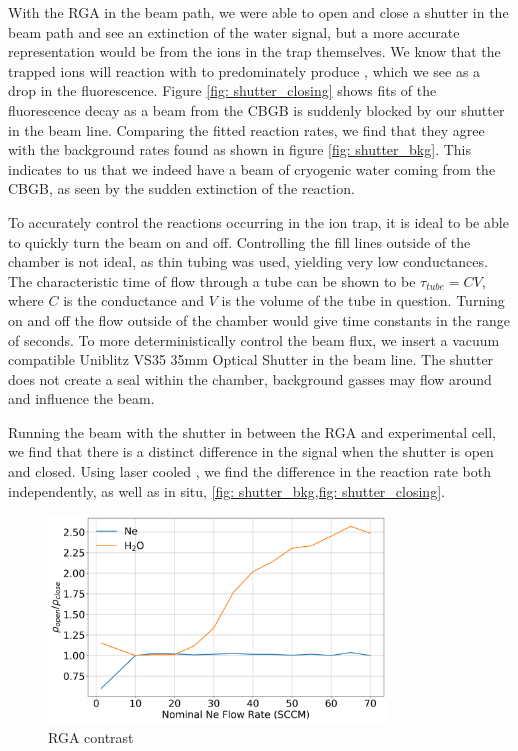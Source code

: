With the RGA in the beam path, we were able to open and close a shutter in the beam path and see an extinction of the water signal, but a more accurate representation would be from the ions in the trap themselves. We know that the trapped  ions will reaction with  to predominately produce , which we see as a drop in the fluorescence. Figure \ref{fig: shutter_closing} shows fits of the fluorescence decay as a beam from the CBGB is suddenly blocked by our shutter in the beam line. Comparing the fitted reaction rates, we find that they agree with the background rates found as shown in figure \ref{fig: shutter_bkg}. This indicates to us that we indeed have a beam of cryogenic water coming from the CBGB, as seen by the sudden extinction of the  reaction.

To accurately control the reactions occurring in the ion trap, it is ideal to be able to quickly turn the beam on and off. Controlling the fill lines outside of the chamber is not ideal, as thin tubing was used, yielding very low conductances. The characteristic time of flow through a tube can be shown to be $\tau_{tube} = C V$, where $C$ is the conductance and $V$ is the volume of the tube in question. Turning on and off the flow outside of the chamber would give time constants in the range of seconds. To more deterministically control the beam flux, we insert a vacuum compatible Uniblitz VS35 35mm Optical Shutter in the beam line. The shutter does not create a seal within the chamber, background gasses may flow around and influence the beam.

Running the beam with the shutter in between the RGA and experimental cell, we find that there is a distinct difference in the  signal when the shutter is open and closed. Using laser cooled , we find the difference in the reaction rate both independently, as well as in situ, \cref{fig: shutter_bkg,fig: shutter_closing}.

\begin{figure}[H]
	\centering
	\includegraphics[width=0.8\textwidth]{images/CBGB_RGA_contrast.png}
	\caption{RGA contrast}
	\label{fig: RGA contrast}
\end{figure}

